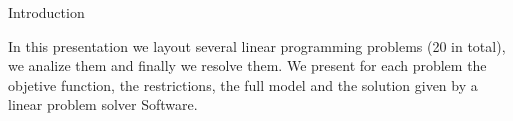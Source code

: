 \begin{frame}{Introduction}

In this presentation we layout several linear programming problems (20 in total),
we analize them and finally we resolve them. We present for each problem the
objetive function, the restrictions, the full model and the solution given by
a linear problem solver Software.

\end{frame}
